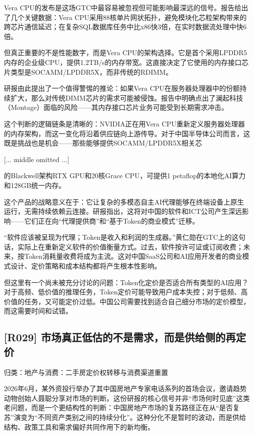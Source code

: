 \documentclass[11pt]{ctexart}
\begin{document}
Vera CPU的发布是这场GTC中最容易被忽视但可能影响最深远的信号。报告给出了几个关键数据：Vera CPU采用88核单片网状拓扑，避免模块化芯粒架构带来的跨芯片通信延迟；在复杂SQL数据库任务中比x86快3倍，在实时数据流处理中快6倍。

但真正重要的不是性能数字，而是Vera CPU的架构选择。它是首个采用LPDDR5内存的企业级CPU，提供1.2TB/s的内存带宽。这直接决定了它使用的内存接口芯片类型是SOCAMM/LPDDR5X，而非传统的RDIMM。

研报由此提出了一个值得警惕的推论：如果Vera CPU在服务器处理器中的份额持续扩大，那么对传统DIMM芯片的需求可能被侵蚀。报告中明确点出了澜起科技（Montage）面临的风险——其内存接口芯片业务可能受到长期需求冲击。

这个判断的逻辑链条是清晰的：NVIDIA正在用Vera CPU重新定义服务器处理器的内存架构，而这一变化将沿着供应链向上游传导。对于中国半导体公司而言，这既是挑战也是机会——那些能够提供SOCAMM/LPDDR5X相关芯

[... middle omitted ...]

的Blackwell架构RTX GPU和20核Grace CPU，可提供1 petaflop的本地化AI算力和128GB统一内存。

这个产品的战略意义在于：它让复杂的多模态自主AI代理能够在终端设备上原生运行，无需持续依赖云连接。研报指出，这将对中国的软件和ICT公司产生深远影响——它们正在向“代理提供商”和“基于Token的商业模式”迁移。

“软件应该被呈现为代理；Token是收入和利润的生成器。”黄仁勋在GTC上的这句话，实际上在重新定义软件的价值衡量方式。过去，软件按许可证或订阅收费；未来，按Token消耗量收费将成为主流。这对中国SaaS公司和AI应用开发者的商业模式设计、定价策略和成本结构都将产生根本性影响。

但这里有一个尚未被充分讨论的问题：Token化定价是否适合所有类型的AI应用？对于高频、低价值的推理任务，Token定价可能导致用户成本失控；对于低频、高价值的任务，又可能定价过低。中国公司需要找到适合自己细分市场的定价模型，而这需要时间和试错。

\subsection{[R029] 市场真正低估的不是需求，而是供给侧的再定价}
{\small\color{refgray}归类：地产与消费：二手房定价权转移与消费渠道重置}

2026年6月，某外资投行举办了其中国房地产专家电话系列的首场会议，邀请趋势动物创始人聂聪分享对市场的判断。这份研报的核心信号并非“市场何时见底”这类老问题，而是一个更结构性的判断：中国房地产市场的复苏路径正在从“是否复苏”演变为“不同资产类别之间的持续分化”。这种分化不是暂时的波动，而是供给结构、政策工具和需求偏好共同作用下的新均衡。
\end{document}

